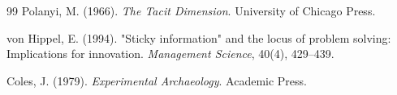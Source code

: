 \documentclass[11pt]{book}
\begin{document}
\begin{thebibliography}{99}
Polanyi, M. (1966). \textit{The Tacit Dimension}. University of Chicago Press.

von Hippel, E. (1994). "Sticky information" and the locus of problem solving: Implications for innovation. \textit{Management Science}, 40(4), 429--439.

Coles, J. (1979). \textit{Experimental Archaeology}. Academic Press.

\end{thebibliography}
\end{document}
